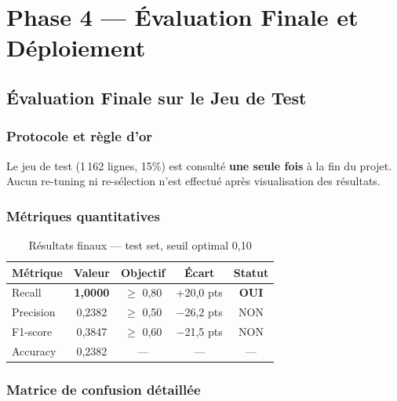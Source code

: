\documentclass[11pt,a4paper,twoside,openright]{report}
\begin{document}
\part{Phase 4 — Évaluation Finale et Déploiement}

\chapter{Évaluation Finale sur le Jeu de Test}
\label{ch:eval}

\section{Protocole et règle d'or}

\begin{keybox}
Le jeu de test (1\,162 lignes, 15\%) est consulté \textbf{une seule fois} à la fin du projet. Aucun re-tuning ni re-sélection n'est effectué après visualisation des résultats.
\end{keybox}

\section{Métriques quantitatives}

\begin{table}[H]
  \centering
  \caption{Résultats finaux — test set, seuil optimal 0,10}
  \label{tab:test}
  \begin{tabular}{lcccc}
    \toprule
    \textbf{Métrique} & \textbf{Valeur} & \textbf{Objectif} & \textbf{Écart} & \textbf{Statut} \\
    \midrule
    Recall    & \textbf{1,0000} & $\geq$ 0,80 & +20,0 pts & \textcolor{success}{\textbf{OUI}} \\
    Precision & 0,2382 & $\geq$ 0,50 & $-$26,2 pts & \textcolor{danger}{NON} \\
    F1-score  & 0,3847 & $\geq$ 0,60 & $-$21,5 pts & \textcolor{danger}{NON} \\
    Accuracy  & 0,2382 & — & — & — \\
    \bottomrule
  \end{tabular}
\end{table}

\section{Matrice de confusion détaillée}
\end{document}
